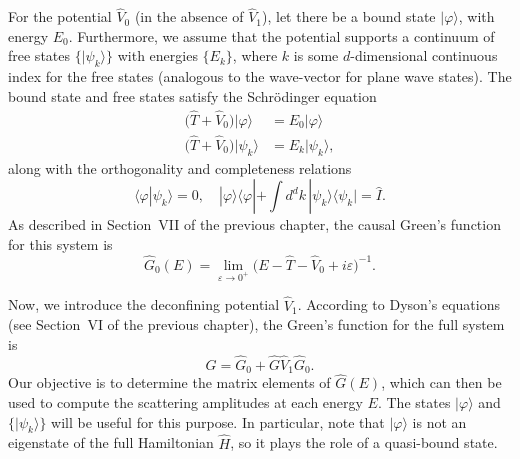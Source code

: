 \documentclass[pra,12pt]{revtex4}
\begin{document}
For the potential $\hat{V}_0$ (in the absence of $\hat{V}_1$), let
there be a bound state $|\varphi\rangle$, with energy $E_0$.
Furthermore, we assume that the potential supports a continuum of free
states $\{|\psi_k\rangle\}$ with energies $\{E_k\}$, where $k$ is some
$d$-dimensional continuous index for the free states (analogous to the
wave-vector for plane wave states).  The bound state and free states
satisfy the Schr\"odinger equation
$$\begin{aligned}\big(\hat{T} + \hat{V}_0\big) |\varphi\rangle \; &= E_0 |\varphi\rangle \\ \big(\hat{T} + \hat{V}_0\big) |\psi_k\rangle &= E_k |\psi_k\rangle,
\end{aligned}$$
along with the orthogonality and completeness relations
$$\langle\varphi|\psi_k\rangle = 0, \quad |\varphi\rangle\langle\varphi| + \int d^dk\, |\psi_k\rangle\langle\psi_k| = \hat{I}.$$
As described in Section~VII of the previous chapter, the causal
Green's function for this system is
$$\hat{G}_0(E) = \lim_{\varepsilon\rightarrow0^+} \Big(E - \hat{T} - \hat{V}_0 + i\varepsilon\Big)^{-1}.$$

Now, we introduce the deconfining potential $\hat{V}_1$.  According to
Dyson's equations (see Section~VI of the previous chapter), the
Green's function for the full system is
$$\hat{G} = \hat{G}_0 + \hat{G} \hat{V}_1 \hat{G}_0.$$
Our objective is to determine the matrix elements of $\hat{G}(E)$,
which can then be used to compute the scattering amplitudes at each
energy $E$.  The states $|\varphi\rangle$ and $\{|\psi_k\rangle\}$
will be useful for this purpose.  In particular, note that
$|\varphi\rangle$ is not an eigenstate of the full Hamiltonian
$\hat{H}$, so it plays the role of a quasi-bound state.
\end{document}
